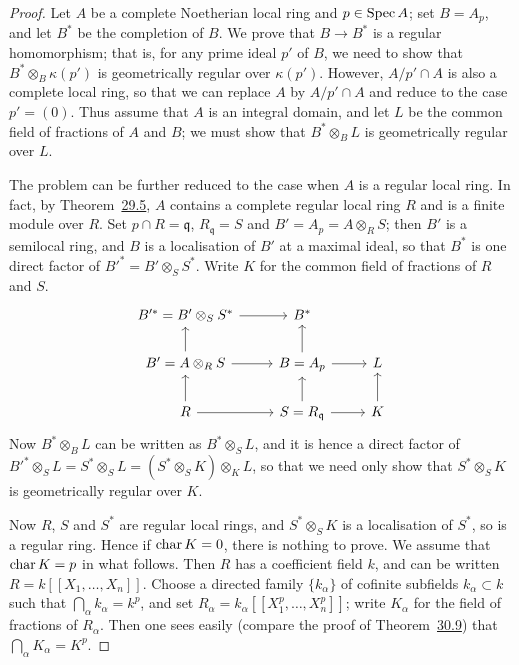 \begin{proof}
Let $A$ be a complete Noetherian local ring and $p \in \operatorname{Spec} A$; set $B = A_p$, and
let $B^*$ be the completion of $B$. We prove that $B \to B^*$ is a regular
homomorphism; that is, for any prime ideal $p'$ of $B$, we need to show that
$B^* \otimes_B \kappa(p')$ is geometrically regular over $\kappa(p')$. However, $A/p' \cap A$ is also a
complete local ring, so that we can replace $A$ by $A/p' \cap A$ and reduce to the
case $p' = (0)$. Thus assume that $A$ is an integral domain, and let $L$ be the
common field of fractions of $A$ and $B$; we must show that $B^* \otimes_B L$ is
geometrically regular over $L$.

The problem can be further reduced to the case when $A$ is a regular local ring.
In fact, by Theorem~\hyperref[thm:29.5]{29.5}, $A$ contains a complete regular local ring $R$ and
is a finite module over $R$. Set $p \cap R = \mathfrak{q}$, $R_\mathfrak{q} = S$ and
$B' = A_p = A \otimes_R S$; then $B'$ is a semilocal ring, and $B$ is a localisation of $B'$
at a maximal ideal, so that $B^*$ is one direct factor of $B'^* = B' \otimes_S S^*$. Write $K$
for the common field of fractions of $R$ and $S$.
\[
\begin{tikzcd}
B'^* = B' \otimes_S S^* \arrow[r] & B^* \\
B' = A \otimes_R S \arrow[u] \arrow[r] & B = A_p \arrow[u] \arrow[r] & L \\
R \arrow[u] \arrow[r] & S = R_\mathfrak{q} \arrow[u] \arrow[r] & K \arrow[u]
\end{tikzcd}
\]
Now $B^* \otimes_B L$ can be written as $B^* \otimes_S L$, and it is hence a direct factor
of $B'^* \otimes_S L = S^* \otimes_S L = (S^* \otimes_S K) \otimes_K L$, so that we need only show
that $S^* \otimes_S K$ is geometrically regular over $K$.

Now $R$, $S$ and $S^*$ are regular local rings, and $S^* \otimes_S K$ is a localisation of
$S^*$, so is a regular ring. Hence if $\operatorname{char} K = 0$, there is nothing to prove. We
assume that $\operatorname{char} K = p$ in what follows. Then $R$ has a coefficient field $k$, and
can be written $R = k[[X_1, \ldots, X_n]]$. Choose a directed family $\{k_\alpha\}$ of cofinite
subfields $k_\alpha \subset k$ such that $\bigcap_\alpha k_\alpha = k^p$, and set
$R_\alpha = k_\alpha[[X_1^p, \ldots, X_n^p]]$; write $K_\alpha$ for the field of fractions of
$R_\alpha$. Then one sees easily (compare the proof of Theorem~\hyperref[thm:30.9]{30.9}) that
$\bigcap_\alpha K_\alpha = K^p$.


\end{proof}
